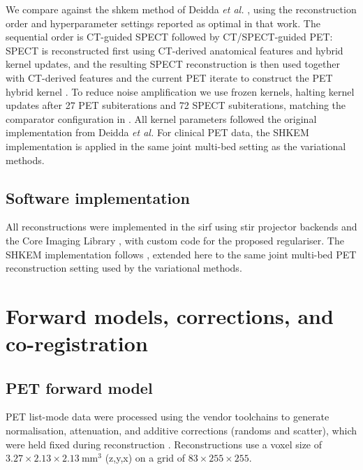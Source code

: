 We compare against the \gls{shkem} method of Deidda \textit{et al.} \cite{deiddaTripleModalityImage2023}, using the reconstruction order and hyperparameter settings reported as optimal in that work. The sequential order is CT-guided SPECT followed by CT/SPECT-guided PET: SPECT is reconstructed first using CT-derived anatomical features and hybrid kernel updates, and the resulting SPECT reconstruction is then used together with CT-derived features and the current PET iterate to construct the PET hybrid kernel \cite{deiddaHybridKernelisedExpectation2022}. To reduce noise amplification we use frozen kernels, halting kernel updates after 27 PET subiterations and 72 SPECT subiterations, matching the comparator configuration in \cite{deiddaTripleModalityImage2023}. All kernel parameters followed the original implementation from Deidda \textit{et al.} For clinical PET data, the SHKEM implementation is applied in the same joint multi-bed setting as the variational methods.

\subsection{Software implementation}
\label{subsec:90y_software}

All reconstructions were implemented in the \acrfull{sirf} \cite{ovtchinnikovSIRFSynergisticImage2017} using \acrfull{stir} projector backends \cite{thielemansSTIRSoftwareTomographic2012a, schrammPARALLELPROJOpensourceFramework2024, fusterIntegrationAdvanced3D2013} and the Core Imaging Library \cite{jorgensenCoreImagingLibrary2021}, with custom code for the proposed regulariser. The SHKEM implementation follows \cite{deiddaTripleModalityImage2023}, extended here to the same joint multi-bed PET reconstruction setting used by the variational methods.

\section{Forward models, corrections, and co-registration}
\label{sec:90y_forward_models}

\subsection{PET forward model}
\label{subsec:90y_pet_forward}

PET list-mode data were processed using the vendor toolchains to generate normalisation, attenuation, and additive corrections (randoms and scatter), which were held fixed during reconstruction \cite{stearnsRandomCoincidenceEstimation2003, iatrou3DImplementationScatter2006}. Reconstructions use a voxel size of $3.27\times 2.13\times 2.13~\mathrm{mm}^3$ (z,y,x) on a grid of $83\times 255\times 255$.

